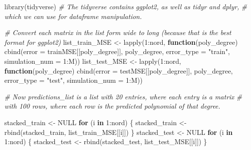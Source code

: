 \documentclass[
]{article}
\newenvironment{Shaded}{\begin{snugshade}}{\end{snugshade}}
\newcommand{\AttributeTok}[1]{\textcolor[rgb]{0.77,0.63,0.00}{#1}}
\newcommand{\CommentTok}[1]{\textcolor[rgb]{0.56,0.35,0.01}{\textit{#1}}}
\newcommand{\ConstantTok}[1]{\textcolor[rgb]{0.00,0.00,0.00}{#1}}
\newcommand{\ControlFlowTok}[1]{\textcolor[rgb]{0.13,0.29,0.53}{\textbf{#1}}}
\newcommand{\DecValTok}[1]{\textcolor[rgb]{0.00,0.00,0.81}{#1}}
\newcommand{\FunctionTok}[1]{\textcolor[rgb]{0.00,0.00,0.00}{#1}}
\newcommand{\NormalTok}[1]{#1}
\newcommand{\OtherTok}[1]{\textcolor[rgb]{0.56,0.35,0.01}{#1}}
\newcommand{\SpecialCharTok}[1]{\textcolor[rgb]{0.00,0.00,0.00}{#1}}
\newcommand{\StringTok}[1]{\textcolor[rgb]{0.31,0.60,0.02}{#1}}
\begin{document}
\begin{Shaded}
\begin{Highlighting}[]
\FunctionTok{library}\NormalTok{(tidyverse) }\CommentTok{\# The tidyverse contains ggplot2, as well as tidyr and dplyr, }
\CommentTok{\# which we can use for dataframe manipulation.}

\CommentTok{\# Convert each matrix in the list form wide to long (because that is the best format for ggplot2)}
\NormalTok{list\_train\_MSE }\OtherTok{\textless{}{-}} \FunctionTok{lapply}\NormalTok{(}\DecValTok{1}\SpecialCharTok{:}\NormalTok{nord, }\ControlFlowTok{function}\NormalTok{(poly\_degree) }\FunctionTok{cbind}\NormalTok{(}\AttributeTok{error =}\NormalTok{ trainMSE[[poly\_degree]], }
\NormalTok{                                                             poly\_degree, }
                                                             \AttributeTok{error\_type =} \StringTok{"train"}\NormalTok{,}
                                                             \AttributeTok{simulation\_num =} \DecValTok{1}\SpecialCharTok{:}\NormalTok{M))}
\NormalTok{list\_test\_MSE }\OtherTok{\textless{}{-}} \FunctionTok{lapply}\NormalTok{(}\DecValTok{1}\SpecialCharTok{:}\NormalTok{nord, }\ControlFlowTok{function}\NormalTok{(poly\_degree) }\FunctionTok{cbind}\NormalTok{(}\AttributeTok{error =}\NormalTok{ testMSE[[poly\_degree]], }
\NormalTok{                                                            poly\_degree, }
                                                            \AttributeTok{error\_type =} \StringTok{"test"}\NormalTok{, }
                                                            \AttributeTok{simulation\_num =} \DecValTok{1}\SpecialCharTok{:}\NormalTok{M))}

\CommentTok{\# Now predictions\_list is a list with 20 entries, where each entry is a matrix }
\CommentTok{\# with 100 rows, where each row is the predicted polynomial of that degree.}

\NormalTok{stacked\_train }\OtherTok{\textless{}{-}} \ConstantTok{NULL}
\ControlFlowTok{for}\NormalTok{ (i }\ControlFlowTok{in} \DecValTok{1}\SpecialCharTok{:}\NormalTok{nord) \{}
\NormalTok{  stacked\_train }\OtherTok{\textless{}{-}}
    \FunctionTok{rbind}\NormalTok{(stacked\_train, list\_train\_MSE[[i]])}
\NormalTok{\}}
\NormalTok{stacked\_test }\OtherTok{\textless{}{-}} \ConstantTok{NULL}
\ControlFlowTok{for}\NormalTok{ (i }\ControlFlowTok{in} \DecValTok{1}\SpecialCharTok{:}\NormalTok{nord) \{}
\NormalTok{  stacked\_test }\OtherTok{\textless{}{-}}
    \FunctionTok{rbind}\NormalTok{(stacked\_test, list\_test\_MSE[[i]])}
\NormalTok{\}}


\end{Highlighting}
\end{Shaded}
\end{document}
